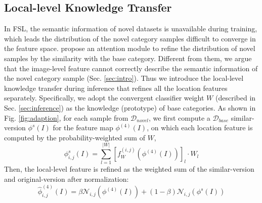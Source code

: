 \documentclass{article}
\begin{document}
\subsection{Local-level Knowledge Transfer}
\label{sec:adaption}
In FSL, the semantic information of novel datasets is unavailable during training, which leads the distribution of the novel category samples difficult to converge in the feature space. \cite{gidaris2018dynamic, liu2019large} propose an attention module to refine the distribution of novel samples by the similarity with the base category. Different from them, we argue that the image-level feature cannot correctly describe the semantic information of the novel category sample (Sec. \ref{sec:intro}).
Thus we introduce the local-level knowledge transfer during inference that refines all the location features separately. Specifically, we adopt the convergent classifier weight $W$ (described in Sec. \ref{sec:inference}) as the knowledge (prototype) of base categories. As shown in Fig. \ref{fig:adaption}, for each sample from $\mathcal D_{novel}$, we first compute a $\mathcal D_{base}$ similar-version $\phi^{s}(I)$ for the feature map $\phi^{(4)}(I)$, on which each location feature is computed by the probability-weighted sum of $W$, 
\begin{equation}
    \phi^{s}_{i, j}(I) =   \sum_{l=1}^{|W|}  [f_W^{(i, j)}(\phi^{(4)}(I))]_l \cdot W_l 
\end{equation}
Then, the local-level feature is refined as the weighted sum of the similar-version and original-version after normalization:
\begin{equation}
    \label{eq:adaption}
    \hat{\phi}_{i,j}^{(4)}(I) = \beta \mathcal N_{i, j}(\phi^{(4)}(I)) + (1-\beta) \mathcal N_{i, j} (\phi^{s}(I))
\end{equation}
\end{document}
